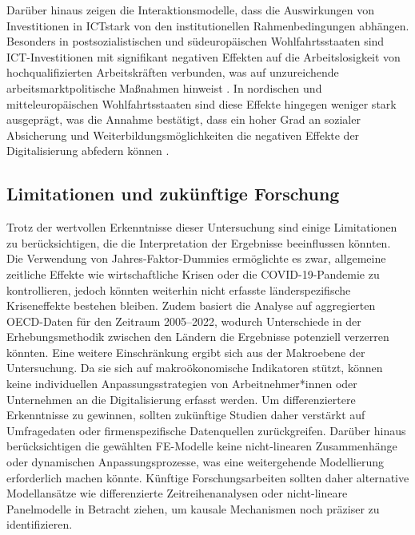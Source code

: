 Darüber hinaus zeigen die Interaktionsmodelle, dass die Auswirkungen von 
Investitionen in \ac{ICT}stark von den institutionellen Rahmenbedingungen abhängen. 
Besonders in postsozialistischen und südeuropäischen Wohlfahrtsstaaten sind 
\ac{ICT}-Investitionen mit signifikant negativen Effekten auf die Arbeitslosigkeit von 
hochqualifizierten Arbeitskräften verbunden, was auf unzureichende arbeitsmarktpolitische 
Maßnahmen hinweist \parencite[S. 3ff]{hall2001varieties}. In nordischen und 
mitteleuropäischen Wohlfahrtsstaaten sind diese Effekte hingegen weniger stark 
ausgeprägt, was die Annahme bestätigt, dass ein hoher Grad an sozialer Absicherung und 
Weiterbildungsmöglichkeiten die negativen Effekte der Digitalisierung abfedern können 
\parencite[S. 27ff]{espingandersen1990thethree}.

\subsection{Limitationen und zukünftige Forschung}

Trotz der wertvollen Erkenntnisse dieser Untersuchung sind einige Limitationen zu 
berücksichtigen, die die Interpretation der Ergebnisse beeinflussen könnten. Die 
Verwendung von Jahres-Faktor-Dummies ermöglichte es zwar, allgemeine zeitliche 
Effekte wie wirtschaftliche Krisen oder die COVID-19-Pandemie zu kontrollieren, 
jedoch könnten weiterhin nicht erfasste länderspezifische Kriseneffekte bestehen 
bleiben. Zudem basiert die Analyse auf aggregierten \ac{OECD}-Daten für den 
Zeitraum 2005–2022, wodurch Unterschiede in der Erhebungsmethodik zwischen den 
Ländern die Ergebnisse potenziell verzerren könnten. Eine weitere Einschränkung 
ergibt sich aus der Makroebene der Untersuchung. Da sie sich auf makroökonomische 
Indikatoren stützt, können keine individuellen Anpassungsstrategien von 
Arbeitnehmer*innen oder Unternehmen an die Digitalisierung erfasst werden. 
Um differenziertere Erkenntnisse zu gewinnen, sollten zukünftige Studien daher 
verstärkt auf Umfragedaten oder firmenspezifische Datenquellen zurückgreifen. 
Darüber hinaus berücksichtigen die gewählten \ac{FE}-Modelle keine nicht-linearen 
Zusammenhänge oder dynamischen Anpassungsprozesse, was eine weitergehende 
Modellierung erforderlich machen könnte. Künftige Forschungsarbeiten sollten 
daher alternative Modellansätze wie differenzierte Zeitreihenanalysen oder 
nicht-lineare Panelmodelle in Betracht ziehen, um kausale Mechanismen noch 
präziser zu identifizieren.

